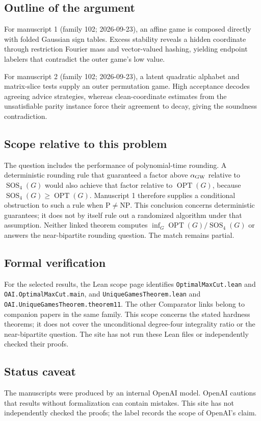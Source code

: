 \documentclass[11pt]{article}
\begin{document}
\subsection{Outline of the argument}
For manuscript 1 (family 102; 2026-09-23), an affine game is composed directly with folded Gaussian sign tables. Excess stability reveals a hidden coordinate through restriction Fourier mass and vector-valued hashing, yielding endpoint labelers that contradict the outer game's low value.

For manuscript 2 (family 102; 2026-09-23), a latent quadratic alphabet and matrix-slice tests supply an outer permutation game. High acceptance decodes agreeing advice strategies, whereas clean-coordinate estimates from the unsatisfiable parity instance force their agreement to decay, giving the soundness contradiction.

\subsection{Scope relative to this problem}
The question includes the performance of polynomial-time rounding. A deterministic rounding rule that guaranteed a factor above $\alpha_{\rm GW}$ relative to $\operatorname{SOS}_4(G)$ would also achieve that factor relative to $\operatorname{OPT}(G)$, because $\operatorname{SOS}_4(G)\ge\operatorname{OPT}(G)$. Manuscript 1 therefore supplies a conditional obstruction to such a rule when $\mathrm P\ne\mathrm{NP}$. This conclusion concerns deterministic guarantees; it does not by itself rule out a randomized algorithm under that assumption. Neither linked theorem computes $\inf_G\operatorname{OPT}(G)/\operatorname{SOS}_4(G)$ or answers the near-bipartite rounding question. The match remains partial.

\subsection{Formal verification}
For the selected results, the Lean scope page identifies \texttt{OptimalMaxCut.lean} and \texttt{OAI.OptimalMaxCut.main}, and \texttt{UniqueGamesTheorem.lean} and \texttt{OAI.UniqueGamesTheorem.theorem11}. The other Comparator links belong to companion papers in the same family. This scope concerns the stated hardness theorems; it does not cover the unconditional degree-four integrality ratio or the near-bipartite question. The site has not run these Lean files or independently checked their proofs.

\subsection{Status caveat}
The manuscripts were produced by an internal OpenAI model. OpenAI cautions that results without formalization can contain mistakes. This site has not independently checked the proofs; the label records the scope of OpenAI's claim.
\end{document}
